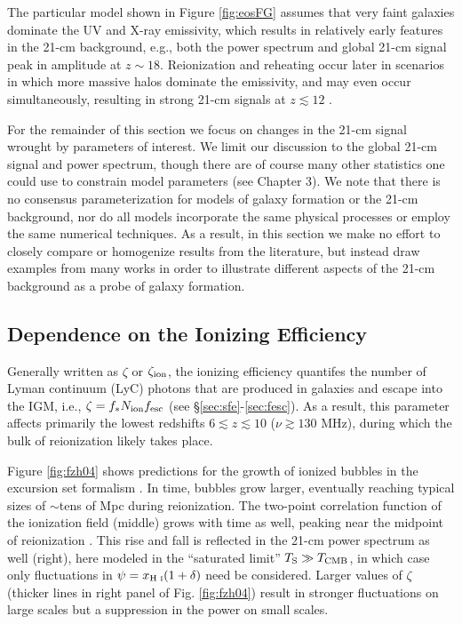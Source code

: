 The particular model shown in Figure \ref{fig:eosFG} \cite{Mesinger2016} assumes that very faint galaxies dominate the UV and X-ray emissivity, which results in relatively early features in the 21-cm background, e.g., both the power spectrum and global 21-cm signal peak in amplitude at $z \sim 18$. Reionization and reheating occur later in scenarios in which more massive halos dominate the emissivity, and may even occur simultaneously, resulting in strong 21-cm signals at $z \lesssim 12$ \cite{Mesinger2016,Mirocha2017,Park2019}. 

For the remainder of this section we focus on changes in the 21-cm signal wrought by parameters of interest. We limit our discussion to the global 21-cm signal and power spectrum, though there are of course many other statistics one could use to constrain model parameters (see Chapter 3). We note that there is no consensus parameterization for models of galaxy formation or the 21-cm background, nor do all models incorporate the same physical processes or employ the same numerical techniques. As a result, in this section we make no effort to closely compare or homogenize results from the literature, but instead draw examples from many works in order to illustrate different aspects of the 21-cm background as a probe of galaxy formation. 

\subsection{Dependence on the Ionizing Efficiency} \label{sec:dep_zeta}
Generally written as $\zeta$ or $\zeta_{\text{ion}}$, the ionizing efficiency quantifes the number of Lyman continuum (LyC) photons that are produced in galaxies and escape into the IGM, i.e., $\zeta=f_{\ast} N_{\text{ion}} f_{\text{esc}}$ (see \S\ref{sec:sfe}-\ref{sec:fesc}). As a result, this parameter affects primarily the lowest redshifts $6 \lesssim z \lesssim 10$ ($\nu \gtrsim 130$ MHz), during which the bulk of reionization likely takes place.

Figure \ref{fig:fzh04} shows predictions for the growth of ionized bubbles in the excursion set formalism \cite{Furlanetto2004}. In time, bubbles grow larger, eventually reaching typical sizes of $\sim $tens of Mpc during reionization. The two-point correlation function of the ionization field (middle) grows with time as well, peaking near the midpoint of reionization \cite{Lidz2008}. This rise and fall is reflected in the 21-cm power spectrum as well (right), here modeled in the ``saturated limit'' $T_{\text{S}} \gg T_{\text{CMB}}$, in which case only fluctuations in $\psi = x_{\text{H } \textsc{i}} (1 + \delta)$ need be considered. Larger values of $\zeta$ (thicker lines in right panel of Fig. \ref{fig:fzh04}) result in stronger fluctuations on large scales but a suppression in the power on small scales.

